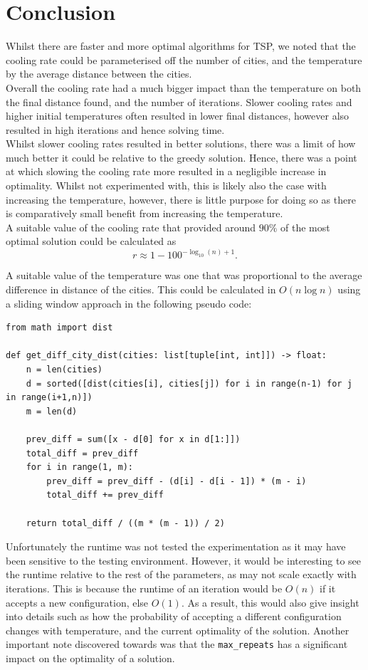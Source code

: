 \documentclass{article}
\begin{document}
\section{Conclusion}
Whilst there are faster and more optimal algorithms for TSP, we noted that the cooling rate could be parameterised off the number of cities, and the temperature by the average distance between the cities.
\\

Overall the cooling rate had a much bigger impact than the temperature on both the final distance found, and the number of iterations.
Slower cooling rates and higher initial temperatures often resulted in lower final distances, however also resulted in high iterations and hence solving time.
\\

Whilst slower cooling rates resulted in better solutions, there was a limit of how much better it could be relative to the greedy solution.
Hence, there was a point at which slowing the cooling rate more resulted in a negligible increase in optimality.
Whilst not experimented with, this is likely also the case with increasing the temperature, however, there is little purpose for doing so as there is comparatively small benefit from increasing the temperature.
\\

A suitable value of the cooling rate that provided around $90\%$ of the most optimal solution could be calculated as 
$$r \approx 1 - 100^{-\log_{10}(n) + 1}.$$

A suitable value of the temperature was one that was proportional to the average difference in distance of the cities.
This could be calculated in $O(n\log n)$ using a sliding window approach in the following pseudo code:

\begin{verbatim}
from math import dist

def get_diff_city_dist(cities: list[tuple[int, int]]) -> float:
    n = len(cities)
    d = sorted([dist(cities[i], cities[j]) for i in range(n-1) for j in range(i+1,n)])
    m = len(d)
    
    prev_diff = sum([x - d[0] for x in d[1:]])
    total_diff = prev_diff
    for i in range(1, m):
        prev_diff = prev_diff - (d[i] - d[i - 1]) * (m - i)
        total_diff += prev_diff
    
    return total_diff / ((m * (m - 1)) / 2)
\end{verbatim}

Unfortunately the runtime was not tested the experimentation as it may have been sensitive to the testing environment.
However, it would be interesting to see the runtime relative to the rest of the parameters, as may not scale exactly with iterations.
This is because the runtime of an iteration would be $O(n)$ if it accepts a new configuration, else $O(1)$.
As a result, this would also give insight into details such as how the probability of accepting a different configuration changes with temperature, and the current optimality of the solution.
Another important note discovered towards was that the \texttt{max\_repeats} has a significant impact on the optimality of a solution.
\end{document}
